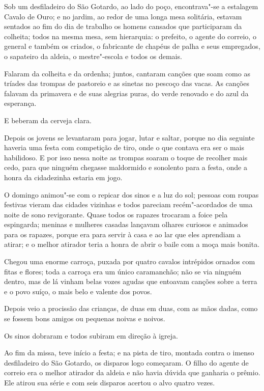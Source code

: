 Sob um desfiladeiro do São Gotardo, ao lado do poço, encontrava"-se a
estalagem Cavalo de Ouro; e no jardim, ao redor de uma longa mesa
solitária, estavam sentados ao fim do dia de trabalho os homens
cansados que participaram da colheita; todos na mesma mesa, sem
hierarquia: o prefeito, o agente do correio, o general e também os
criados, o fabricante de chapéus de palha e seus empregados, o
sapateiro da aldeia, o mestre"-escola e todos os demais.

Falaram da colheita e da ordenha; juntos, cantaram canções que soam como
as tríades das trompas de pastoreio e as sinetas no pescoço das vacas.
As canções falavam da primavera e de suas alegrias puras, do verde
renovado e do azul da esperança.

E beberam da cerveja clara.

Depois os jovens se levantaram para jogar, lutar e saltar, porque no dia
seguinte haveria uma festa com competição de tiro, onde o que contava
era ser o mais habilidoso. E por isso nessa noite as trompas soaram o
toque de recolher mais cedo, para que ninguém chegasse maldormido e
sonolento para a festa, onde a honra da cidadezinha estaria em jogo.
\asterisc

O domingo animou"-se com o repicar dos sinos e a luz do sol; pessoas
com roupas festivas vieram das cidades vizinhas e todos pareciam
recém"-acordados de uma noite de sono revigorante. Quase todos os
rapazes trocaram a foice pela espingarda; meninas e mulheres casadas
lançavam olhares curiosos e animados para os rapazes, porque era para
servir à casa e ao lar que eles aprendiam a atirar; e o melhor atirador
teria a honra de abrir o baile com a moça mais bonita.

Chegou uma enorme carroça, puxada por quatro cavalos intrépidos ornados
com fitas e flores; toda a carroça era um único caramanchão; não se via
ninguém dentro, mas de lá vinham belas vozes agudas que entoavam
canções sobre a terra e o povo suíço, o mais belo e valente dos povos. 

Depois veio a procissão das crianças, de duas em duas, com as mãos
dadas, como se fossem bons amigos ou pequenas noivas e noivos.

Os sinos dobraram e todos subiram em direção à igreja.

Ao fim da missa, teve início a festa; e na pista de tiro, montada contra
o imenso desfiladeiro do São Gotardo, os disparos logo começaram. O
filho do agente de correio era o melhor atirador da aldeia e não havia
dúvida que ganharia o prêmio. Ele atirou sua série e com seis disparos
acertou o alvo quatro vezes.

